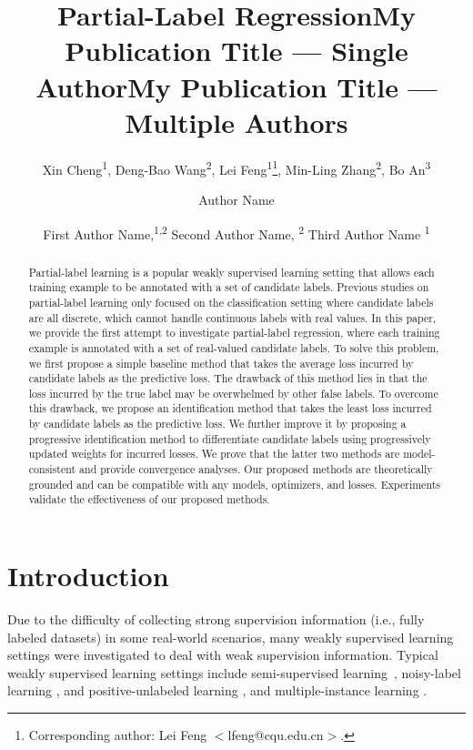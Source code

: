 \documentclass[letterpaper]{article} %
\title{Partial-Label Regression}
\author{
Xin Cheng\textsuperscript{\rm 1}, Deng-Bao Wang\textsuperscript{\rm 2}, Lei Feng\textsuperscript{\rm 1}\thanks{Corresponding author: Lei Feng $<$lfeng@cqu.edu.cn$>$.}, Min-Ling Zhang\textsuperscript{\rm 2}, Bo An\textsuperscript{\rm 3}
}
\title{My Publication Title --- Single Author}
\author {
    Author Name
}
\title{My Publication Title --- Multiple Authors}
\author {
    First Author Name,\textsuperscript{\rm 1,\rm 2}
    Second Author Name, \textsuperscript{\rm 2}
    Third Author Name \textsuperscript{\rm 1}
}
\begin{document}
\maketitle
\begin{abstract}
Partial-label learning is a popular weakly supervised learning setting that allows each training example to be annotated with a set of candidate labels. Previous studies on partial-label learning only focused on the classification setting where candidate labels are all discrete, which cannot handle continuous labels with real values. In this paper, we provide the first attempt to investigate partial-label regression, where each training example is annotated with a set of real-valued candidate labels. To solve this problem, we first propose a simple baseline method that takes the average loss incurred by candidate labels as the predictive loss. The drawback of this method lies in that the loss incurred by the true label may be overwhelmed by other false labels. To overcome this drawback, we propose an identification method that takes the least loss incurred by candidate labels as the predictive loss. We further improve it by proposing a progressive identification method to differentiate candidate labels using progressively updated weights for incurred losses. We prove that the latter two methods are model-consistent and provide convergence analyses. Our proposed methods are theoretically grounded and can be compatible with any models, optimizers, and losses. Experiments validate the effectiveness of our proposed methods. 
\end{abstract}

\section{Introduction}
Due to the difficulty of collecting strong supervision information (i.e., fully labeled datasets) in some real-world scenarios, many weakly supervised learning settings were investigated to deal with weak supervision information. Typical weakly supervised learning settings include semi-supervised learning~\cite{Chapelle2006semi,sohn2020fixmatch}, noisy-label learning \cite{liu2015classification,malach2017decoupling,patrini2017making}, and positive-unlabeled learning \cite{elkan2008learning,niu2016theoretical,Kiryo2017Positive}, and multiple-instance learning \cite{maron1997framework,andrews2002support}.
\end{document}
